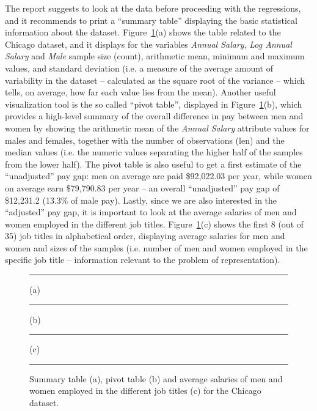 The report suggests to look at the data before proceeding with the regressions, and it recommends to print a ``summary table'' displaying the basic statistical information about the dataset. Figure~\ref{fig:chicago_glassdoor1}(a) shows the table related to the Chicago dataset, and it displays for the variables \textit{Annual Salary}, \textit{Log Annual Salary} and \textit{Male} sample size (count), arithmetic mean, minimum and maximum values, and standard deviation (i.e. a measure of the average amount of variability in the dataset -- calculated as the square root of the variance -- which tells, on average, how far each value lies from the mean).
Another useful visualization tool is the so called ``pivot table'', displayed in Figure~\ref{fig:chicago_glassdoor1}(b), which provides a high-level summary of the overall difference in pay between men and women by showing the arithmetic mean of the \textit{Annual Salary} attribute values for males and females, together with the number of observations (len) and the median values (i.e. the numeric values separating the higher half of the samples from the lower half). The pivot table is also useful to get a first estimate of the ``unadjusted'' pay gap: men on average are paid \$92,022.03 per year, while women on average earn \$79,790.83 per year -- an overall ``unadjusted'' pay gap of \$12,231.2 (13.3\% of male pay).
Lastly, since we are also interested in the ``adjusted'' pay gap, it is important to look at the average salaries of men and women employed in the different job titles. Figure~\ref{fig:chicago_glassdoor1}(c) shows the first 8 (out of 35) job titles in alphabetical order, displaying average salaries for men and women and sizes of the samples (i.e. number of men and women employed in the specific job title -- information relevant to the problem of representation).

\begin{figure}[h!]
\centering
\noindent\rule{\linewidth}{0.4pt}\par
\caption*{(a)}
\noindent\rule{\linewidth}{0.4pt}\par
\caption*{(b)}
\noindent\rule{\linewidth}{0.4pt}\par
\caption*{(c)}
\noindent\rule{\linewidth}{0.4pt}
\caption{Summary table (a), pivot table (b) and average salaries of men and women employed in the different job titles (c) for the Chicago dataset.}
\label{fig:chicago_glassdoor1}
\end{figure}

